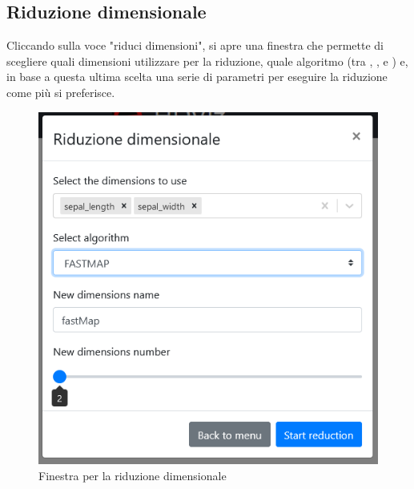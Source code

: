 \subsection{Riduzione dimensionale} 
Cliccando sulla voce "riduci dimensioni", si apre una finestra che permette di scegliere quali dimensioni utilizzare per la riduzione, quale algoritmo (tra , ,  e ) e, in base a questa ultima scelta una serie di parametri per eseguire la riduzione come più si preferisce.
\begin{figure}[H]
		\includegraphics[scale=0.5]{Images/RiduzioneDimensionale.png}
		\centering
		\caption{Finestra per la riduzione dimensionale}
\end{figure}

